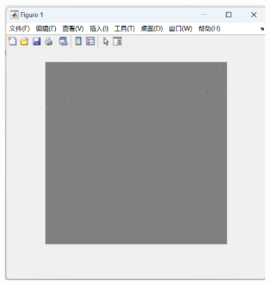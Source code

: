 \documentclass[a4paper,11pt,UTF8]{ctexart}
\newcommand{\bottomcaption}{%
\setlength{\abovecaptionskip}{6pt}%
\setlength{\belowcaptionskip}{6pt}%
\caption}
\newcommand{\xiaowuhao}{\fontsize{9pt}{\baselineskip}\selectfont}   %
\begin{document}
\begin{itemize}
\begin{figure}[!htbp]
        \includegraphics[width=\textwidth]{LSB_compare_result.png}
        \bottomcaption{\xiaowuhao{生成的所有的随机位置}}
        \end{figure}
    

\end{itemize}
\end{document}
